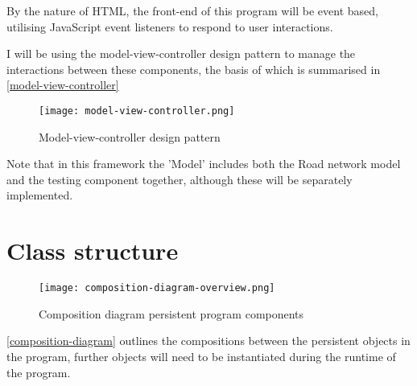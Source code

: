     By the nature of HTML, the front-end of this program will be event based, utilising JavaScript event listeners to respond to user interactions.

    I will be using the model-view-controller design pattern to manage the interactions between these components, the basis of which is summarised in \autoref{model-view-controller}

    \begin{figure}
        \centering
        \texttt{[image: model-view-controller.png]}
        \caption{Model-view-controller design pattern}
        \label{model-view-controller}
    \end{figure}

    Note that in this framework the 'Model' includes both the Road network model and the testing component together, although these will be separately implemented.

\section{Class structure}

    \begin{figure}
        \centering
        \texttt{[image: composition-diagram-overview.png]}
        \caption{Composition diagram persistent program components}
        \label{composition-diagram}
    \end{figure}

    \autoref{composition-diagram} outlines the compositions between the persistent objects in the program, further objects will need to be instantiated during the runtime of the program.

